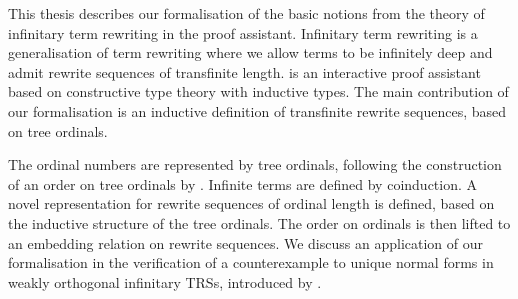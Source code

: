 
This thesis describes our formalisation of the basic notions from
the theory of infinitary term rewriting in the \Coq proof
assistant.
Infinitary term rewriting is a generalisation of term rewriting where
we allow terms to be infinitely deep and admit rewrite sequences of
transfinite length.
\Coq is an interactive proof assistant based on constructive type
theory with inductive types.
The main contribution of our formalisation is an inductive
definition of transfinite rewrite sequences, based on tree
ordinals.

The ordinal numbers are
represented by tree ordinals, following the construction of an order
on tree ordinals by \citet{hancock-08}. Infinite terms are defined by
coinduction. A novel representation for rewrite sequences of ordinal
length is defined, based on the inductive structure of the tree
ordinals. The order on ordinals is then lifted to an embedding
relation on rewrite sequences. We discuss an application of our
formalisation in the verification of a counterexample to unique normal
forms in weakly orthogonal infinitary TRSs, introduced
by \citet{endrullis-10}.

